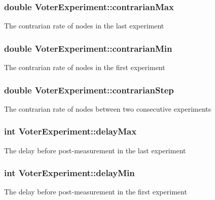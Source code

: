 \subsubsection[{contrarian\+Max}]{\setlength{\rightskip}{0pt plus 5cm}double Voter\+Experiment\+::contrarian\+Max}\label{class_voter_experiment_ad98a9b74ed00fff511a28ac7f2eb3ea5}
The contrarian rate of nodes in the last experiment \hypertarget{class_voter_experiment_a8f63fda5e3d9e999338d8dad4e8c7fec}{}
\subsubsection[{contrarian\+Min}]{\setlength{\rightskip}{0pt plus 5cm}double Voter\+Experiment\+::contrarian\+Min}\label{class_voter_experiment_a8f63fda5e3d9e999338d8dad4e8c7fec}
The contrarian rate of nodes in the first experiment \hypertarget{class_voter_experiment_a97cb958e2e52c3edd65bcfad893ffbe6}{}
\subsubsection[{contrarian\+Step}]{\setlength{\rightskip}{0pt plus 5cm}double Voter\+Experiment\+::contrarian\+Step}\label{class_voter_experiment_a97cb958e2e52c3edd65bcfad893ffbe6}
The contrarian rate of nodes between two consecutive experiments \hypertarget{class_voter_experiment_a1556d0e6c7c1590a8ba3604806738b51}{}
\subsubsection[{delay\+Max}]{\setlength{\rightskip}{0pt plus 5cm}int Voter\+Experiment\+::delay\+Max}\label{class_voter_experiment_a1556d0e6c7c1590a8ba3604806738b51}
The delay before post-\/measurement in the last experiment \hypertarget{class_voter_experiment_a65edc09b6f6077cd29739e8f93c46246}{}
\subsubsection[{delay\+Min}]{\setlength{\rightskip}{0pt plus 5cm}int Voter\+Experiment\+::delay\+Min}\label{class_voter_experiment_a65edc09b6f6077cd29739e8f93c46246}
The delay before post-\/measurement in the first experiment \hypertarget{class_voter_experiment_a1c95cd8bdfefbcb1c51560f2b9fc5b85}{}
